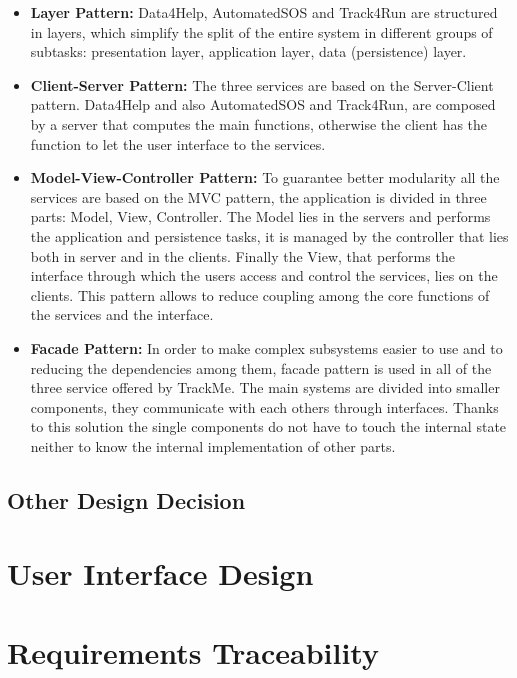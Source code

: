 \documentclass[a4paper]{article}
\begin{document}
\begin{itemize}
    \item \textbf{Layer Pattern:}
     Data4Help, AutomatedSOS and Track4Run are structured in layers, which simplify the split of the entire system in different groups of subtasks: presentation layer, application layer, data (persistence) layer.
     
    \item \textbf{Client-Server Pattern:} The three services are based on the Server-Client pattern. Data4Help and also AutomatedSOS and Track4Run, are composed by a server that computes the main functions, otherwise the client has the function to let the user interface to the services.
    
    \item \textbf{Model-View-Controller Pattern:} To guarantee better modularity all the services are based on the MVC pattern, the application is divided in three parts: Model, View, Controller. The Model lies in the servers and performs the application and persistence tasks, it is managed by the controller that lies both in server and in the clients. Finally the View, that performs the interface through which the users access and control the services, lies on the clients. This pattern allows to reduce coupling among the core functions of the services and the interface.
    
    \item \textbf{Facade Pattern:} In order to make complex subsystems easier to use and to reducing the dependencies among them, facade pattern is used in all of the three service offered by TrackMe. The main systems are divided into smaller components, they communicate with each others through interfaces. Thanks to this solution the single components do not have to touch the internal state neither to know the internal implementation of other parts.
    
\end{itemize}

\subsection{Other Design Decision}
\clearpage

\section{User Interface Design}
\clearpage

\section{Requirements Traceability}
\end{document}
